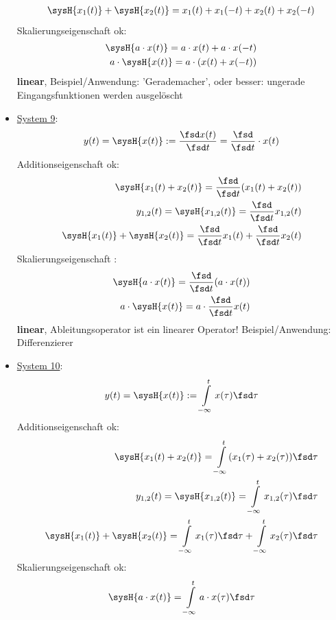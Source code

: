 \begin{Loesung}
\begin{itemize}
\begin{align}
\sysH{x_1(t)} + \sysH{x_2(t)} = x_{1}(t)+x_{1}(-t) + x_{2}(t)+x_{2}(-t)
\end{align}
Skalierungseigenschaft ok:
\begin{align}
\sysH{a \cdot x(t)}= a \cdot x(t) + a \cdot x(-t)\\
a \cdot \sysH{x(t)}= a \cdot (x(t) + x(-t))
\end{align}
\textbf{linear}, Beispiel/Anwendung: 'Gerademacher', oder besser: ungerade
Eingangsfunktionen werden ausgelöscht
\item  \underline{System 9}:
\begin{equation}
y(t) = \sysH{x(t)}:= \frac{\fsd x(t)}{\fsd t} = \frac{\fsd}{\fsd t} \cdot x(t)
\end{equation}
Additionseigenschaft ok:
\begin{align}
\sysH{x_1(t)+x_2(t)}=\frac{\fsd}{\fsd t} (x_1(t)+x_2(t))\\
y_{1,2}(t) = \sysH{x_{1,2}(t)}= \frac{\fsd}{\fsd t} x_{1,2}(t)\\
\sysH{x_1(t)} + \sysH{x_2(t)} = \frac{\fsd}{\fsd t} x_{1}(t) + \frac{\fsd}{\fsd t} x_{2}(t)
\end{align}
Skalierungseigenschaft :
\begin{align}
\sysH{a \cdot x(t)}= \frac{\fsd}{\fsd t}(a \cdot x(t))\\
a \cdot \sysH{x(t)}= a\cdot \frac{\fsd}{\fsd t} x(t)
\end{align}
\textbf{linear}, Ableitungsoperator ist ein linearer Operator!
Beispiel/Anwendung: Differenzierer
\item  \underline{System 10}:
\begin{equation}
y(t) = \sysH{x(t)}:= \int\limits_{-\infty}^{t} x(\tau) \fsd \tau
\end{equation}
Additionseigenschaft ok:
\begin{align}
\sysH{x_1(t)+x_2(t)}= \int\limits_{-\infty}^{t} (x_1(\tau)+x_2(\tau)) \fsd \tau\\
y_{1,2}(t) = \sysH{x_{1,2}(t)}= \int\limits_{-\infty}^{t} x_{1,2}(\tau) \fsd \tau\\
\sysH{x_1(t)} + \sysH{x_2(t)} = \int\limits_{-\infty}^{t} x_1(\tau) \fsd \tau + \int\limits_{-\infty}^{t} x_2(\tau) \fsd \tau
\end{align}
Skalierungseigenschaft ok:
\begin{align}
\sysH{a \cdot x(t)}= \int\limits_{-\infty}^{t} a \cdot x(\tau) \fsd \tau\\

\end{align}
\end{itemize}
\end{Loesung}
